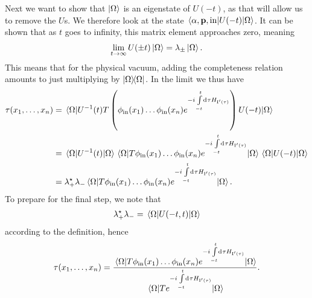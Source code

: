 Next we want to show that $\ket{\Omega}$ is an eigenstate of $U(-t)$, as that will allow us to remove the $U$s. We therefore look at the state $\mel{\alpha, \vb{p}, \text{in}}{U(-t)}{\Omega}$. It can be shown that as $t$ goes to infinity, this matrix element approaches zero, meaning
\begin{align*}
	\lim\limits_{t\to\infty}U(\pm t)\ket{\Omega} = \lambda_{\pm}\ket{\Omega}.
\end{align*}
This means that for the physical vacuum, adding the completeness relation amounts to just multiplying by $\op{\Omega}$. In the limit we thus have
\begin{align*}
	\tau(x_{1}, \dots, x_{n}) &= \expval{U^{-1}(t)\ensuremath{T}\left(\phi_{\text{in}}(x_{1})\dots \phi_{\text{in}}(x_{n})e^{-i\int\limits_{-t}^{t}\dd[]{\tau}H_{\text{I}\ensuremath{^{\prime}}(\tau)}}\right)U(-t)}{\Omega} \\ 
	                          &=\expval{U^{-1}(t)}{\Omega}\expval{\ensuremath{T}\phi_{\text{in}}(x_{1})\dots \phi_{\text{in}}(x_{n})e^{-i\int\limits_{-t}^{t}\dd[]{\tau}H_{\text{I}\ensuremath{^{\prime}}(\tau)}}}{\Omega}\expval{U(-t)}{\Omega} \\
	                          &= \lambda_{+}^{\star}\lambda_{-}\expval{\ensuremath{T}\phi_{\text{in}}(x_{1})\dots \phi_{\text{in}}(x_{n})e^{-i\int\limits_{-t}^{t}\dd[]{\tau}H_{\text{I}\ensuremath{^{\prime}}(\tau)}}}{\Omega}.
\end{align*}
To prepare for the final step, we note that
\begin{align*}
	\lambda_{+}^{\star}\lambda_{-} = \expval{U(-t, t)}{\Omega}
\end{align*}
according to the definition, hence
\begin{align*}
	\tau(x_{1}, \dots, x_{n}) = \frac{\expval{\ensuremath{T}\phi_{\text{in}}(x_{1})\dots \phi_{\text{in}}(x_{n})e^{-i\int\limits_{-t}^{t}\dd[]{\tau}H_{\text{I}\ensuremath{^{\prime}}(\tau)}}}{\Omega}}{\expval{\ensuremath{T}e^{-i\int\limits_{-t}^{t}\dd[]{\tau}H_{\text{I}\ensuremath{^{\prime}}(\tau)}}}{\Omega}}.
\end{align*}

